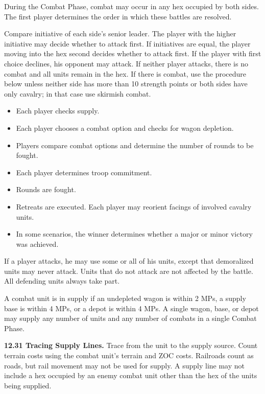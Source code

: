 
During the Combat Phase, combat may occur in any hex occupied by both sides. The first player determines the order in which these battles are resolved.

Compare initiative of each side's senior leader. The player with the higher initiative may decide whether to attack first. If initiatives are equal, the player moving into the hex second decides whether to attack first. If the player with first choice declines, his opponent may attack. If neither player attacks, there is no combat and all units remain in the hex. If there is combat, use the procedure below unless neither side has more than 10 strength points or both sides have only cavalry; in that case use skirmish combat.


\begin{itemize}
\item Each player checks supply.
\item Each player chooses a combat option and checks for wagon depletion.
\item Players compare combat options and determine the number of rounds to be fought.
\item Each player determines troop commitment.
\item Rounds are fought.
\item Retreats are executed. Each player may reorient facings of involved cavalry units.
\item In some scenarios, the winner determines whether a major or minor victory was achieved.
\end{itemize}


If a player attacks, he may use some or all of his units, except that demoralized units may never attack. Units that do not attack are not affected by the battle. All defending units always take part.


A combat unit is in supply if an undepleted wagon is within 2 MPs, a supply base is within 4 MPs, or a depot is within 4 MPs. A single wagon, base, or depot may supply any number of units and any number of combats in a single Combat Phase.

\textbf{12.31 Tracing Supply Lines.} Trace from the unit to the supply source. Count terrain costs using the combat unit's terrain and ZOC costs. Railroads count as roads, but rail movement may not be used for supply. A supply line may not include a hex occupied by an enemy combat unit other than the hex of the units being supplied.

